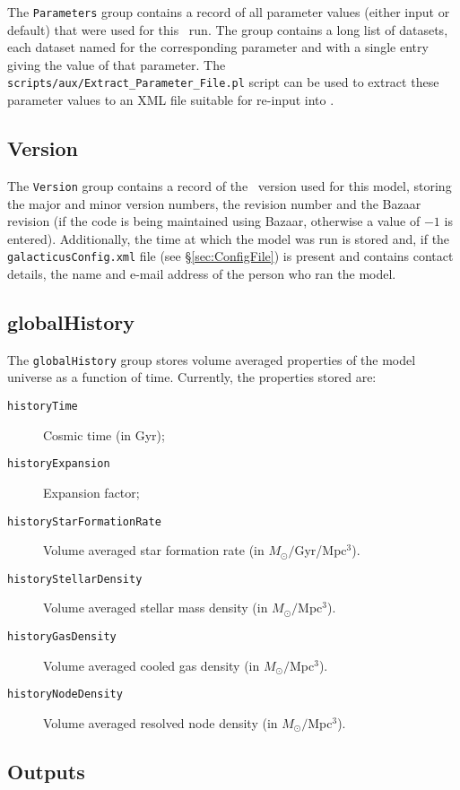 The {\tt Parameters} group contains a record of all parameter values (either input or default) that were used for this \glc\ run. The group contains a long list of datasets, each dataset named for the corresponding parameter and with a single entry giving the value of that parameter. The {\tt scripts/aux/Extract\_Parameter\_File.pl} script can be used to extract these parameter values to an XML file suitable for re-input into \glc.

\subsection{Version}

The {\tt Version} group contains a record of the \glc\ version used for this model, storing the major and minor version numbers, the revision number and the {\sc Bazaar} revision (if the code is being maintained using {\sc Bazaar}, otherwise a value of $-1$ is entered). Additionally, the time at which the model was run is stored and, if the {\tt galacticusConfig.xml} file (see \S\ref{sec:ConfigFile}) is present and contains contact details, the name and e-mail address of the person who ran the model.

\subsection{globalHistory}

The {\tt globalHistory} group stores volume averaged properties of the model universe as a function of time. Currently, the properties stored are:
\begin{description}
 \item[{\tt historyTime}] Cosmic time (in Gyr);
 \item[{\tt historyExpansion}] Expansion factor;
 \item[{\tt historyStarFormationRate}] Volume averaged star formation rate (in $M_\odot/$Gyr/Mpc$^3$).
 \item[{\tt historyStellarDensity}] Volume averaged stellar mass density (in $M_\odot/$Mpc$^3$).
 \item[{\tt historyGasDensity}] Volume averaged cooled gas density (in $M_\odot/$Mpc$^3$).
 \item[{\tt historyNodeDensity}] Volume averaged resolved node density (in $M_\odot/$Mpc$^3$).
\end{description}

\subsection{Outputs}

